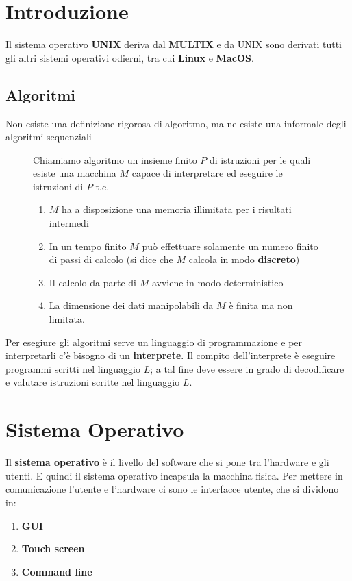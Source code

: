\documentclass[a4paper]{article}
\theoremstyle{break}
\theoremstyle{break}
\theoremstyle{break}
\theoremstyle{break}
\begin{document}


\tableofcontents
\pagebreak

\section{Introduzione}
Il sistema operativo \textbf{UNIX} deriva dal \textbf{MULTIX} e da UNIX sono
derivati tutti gli altri sistemi operativi odierni, tra cui \textbf{Linux} e
\textbf{MacOS}.

\subsection{Algoritmi}
Non esiste una definizione rigorosa di algoritmo, ma ne esiste una informale degli
algoritmi sequenziali
\begin{figure}[H]
  \begin{definition}
    Chiamiamo algoritmo un insieme finito \( P \) di istruzioni per le quali esiste
    una macchina \( M \) capace di interpretare ed eseguire le istruzioni di \( P \) t.c.
    \begin{enumerate}
      \item \( M \) ha a disposizione una memoria illimitata per i risultati intermedi

      \item In un tempo finito \( M \) può effettuare solamente un numero finito di
        passi di calcolo (si dice che \( M \) calcola in modo \textbf{discreto})
        
      \item Il calcolo da parte di \( M \) avviene in modo deterministico
        
      \item La dimensione dei dati manipolabili da \( M \) è finita ma non limitata.
    \end{enumerate}
  \end{definition}
\end{figure}

\noindent
Per esegiure gli algoritmi serve un linguaggio di programmazione e per interpretarli
c'è bisogno di un \textbf{interprete}. Il compito dell'interprete è eseguire programmi
scritti nel linguaggio \( L \); a tal fine deve essere in grado di decodificare
e valutare istruzioni scritte nel linguaggio \( L \).

\section{Sistema Operativo}
Il \textbf{sistema operativo} è il livello del software che si pone tra l'hardware
e gli utenti. E quindi il sistema operativo incapsula la macchina fisica.
Per mettere in comunicazione l'utente e l'hardware ci sono le interfacce utente,
che si dividono in:
\begin{enumerate}
  \item \textbf{GUI}
  \item \textbf{Touch screen}
  \item \textbf{Command line}
\end{enumerate}
\end{document}

